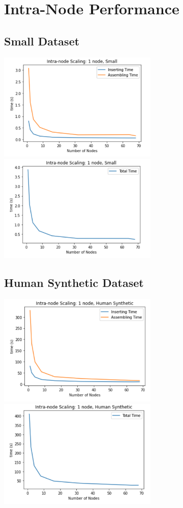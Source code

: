 \documentclass{article}
\begin{document}
\section{Intra-Node Performance}
\subsection{Small Dataset}
\centerline{\includegraphics[width=3in]{figures/intra-small-prof.png}\includegraphics[width=3in]{figures/intra-small.png}}
\subsection{Human Synthetic Dataset}
\centerline{\includegraphics[width=3in]{figures/intra-human-prof.png}\includegraphics[width=3in]{figures/intra-human.png}}
\end{document}
